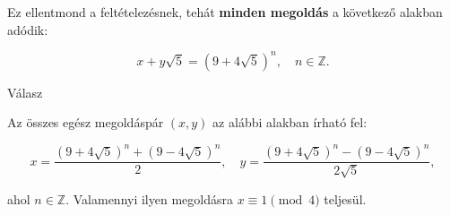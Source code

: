 \begin{solution}
	Ez ellentmond a feltételezésnek, tehát \textbf{minden megoldás} a
	következő alakban adódik:
	
	\[
	x+y\sqrt{5}=(9+4\sqrt{5})^{n},\quad n\in\mathbb{Z}.
	\]
	
	Válasz
	
	Az összes egész megoldáspár $(x,y)$ az alábbi alakban írható fel:
	
	\[
	x=\frac{(9+4\sqrt{5})^{n}+(9-4\sqrt{5})^{n}}{2},\quad y=\frac{(9+4\sqrt{5})^{n}-(9-4\sqrt{5})^{n}}{2\sqrt{5}},
	\]
	
	ahol $n\in\mathbb{Z}$. Valamennyi ilyen megoldásra $x\equiv1\pmod 4$
	teljesül.
\end{solution}

